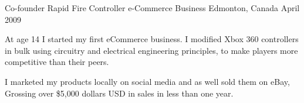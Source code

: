 

\begin{cventries}

  \cventry
    {Co-founder} %
    {Rapid Fire Controller e-Commerce Business} %
    {Edmonton, Canada} %
    {April 2009} %
    {
      \begin{cvitems} %
        \item {At age 14 I started my first eCommerce business. I modified Xbox 360 controllers in bulk using circuitry and electrical engineering principles, to make players more competitive than their peers.}
        \item {I marketed my products locally on social media and as well sold them on eBay, Grossing over \$5,000 dollars USD in sales in less than one year.}
      \end{cvitems}
    }
\end{cventries}
